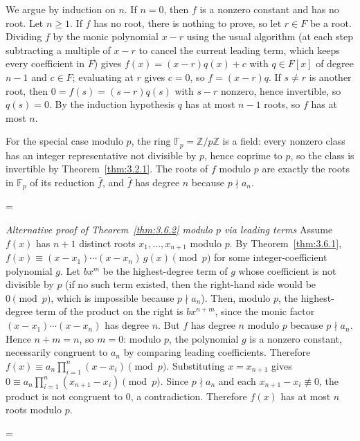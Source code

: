 \documentclass[11pt]{article}
\makeatletter
\theoremstyle{ntstyle}
\let\nt@closedisplay\]
\def\nt@guardedclose{\@ifnextchar\par{\nt@closeafterpar}{\@ifnextchar\end{\postdisplaypenalty\@M\nt@closedisplay}{\nt@closedisplay}}}
\def\nt@closeafterpar\par{\@ifnextchar\par{\nt@closeafterpar}{\@ifnextchar\end{\postdisplaypenalty\@M\nt@closedisplay\par}{\nt@closedisplay\par}}}
\renewenvironment{proof}[1][\proofname]{\par
  \pushQED{\qed}\normalfont\topsep\medskipamount\edef\nt@afterproof{\@endparpenalty=\the\@endparpenalty\relax}\@beginparpenalty\@M\@endparpenalty\@M\let\]\nt@guardedclose\trivlist\item[]\textit{#1\@addpunct{.}} \ignorespaces}{\ifvmode\addpenalty\@M\fi\popQED\nt@afterproof\endtrivlist\@endpefalse}
\newenvironment{altproof}[1][\proofname]{\begin{proof}[#1]\renewcommand{\qedsymbol}{}}{\end{proof}}
\makeatother
\begin{document}
\begin{proof} We argue by induction on $n$. If $n=0$, then $f$ is a nonzero constant
	and has no root. Let $n\ge1$. If $f$ has no root, there is nothing to prove,
	so let $r\in F$ be a root. Dividing $f$ by the monic polynomial $x-r$ using the
	usual algorithm (at each step subtracting a multiple of $x-r$ to cancel
	the current leading term, which keeps every coefficient in $F$) gives
	$f(x)=(x-r)q(x)+c$ with $q\in F[x]$ of degree $n-1$ and $c\in F$; evaluating
	at $r$ gives $c=0$, so $f=(x-r)q$. If $s\neq r$ is another root, then
	$0=f(s)=(s-r)q(s)$ with $s-r$ nonzero, hence invertible, so $q(s)=0$. By the
	induction hypothesis $q$ has at most $n-1$ roots, so $f$ has at most $n$.

	For the special case modulo $p$, the ring $\mathbb{F}_p=\mathbb{Z}/p\mathbb{Z}$ is a field:
	every nonzero class has an integer representative not divisible by $p$,
	hence coprime to $p$, so the class is invertible by
	Theorem~\ref{thm:3.2.1}. The roots of $f$ modulo $p$ are exactly the
	roots in $\mathbb{F}_p$ of its reduction $\bar f$, and $\bar f$ has degree
	$n$ because $p\nmid a_n$.

\end{proof}
\begin{altproof}[Alternative proof of Theorem~\ref{thm:3.6.2} modulo $p$ via leading terms] Assume $f(x)$ has $n+1$ distinct roots
	$x_1, \ldots, x_{n+1}$ modulo $p$. By Theorem~\ref{thm:3.6.1}, $f(x) \equiv (x
		- x_1) \cdots (x - x_n)\, g(x) \pmod{p}$ for some integer-coefficient
	polynomial $g$. Let $b x^m$ be the highest-degree term of $g$ whose
	coefficient is not divisible by $p$ (if no such term existed, then the
	right-hand side would be $0 \pmod{p}$, which is impossible because $p\nmid a_n$).
	Then, modulo $p$, the highest-degree term of the product on the right is
	$b x^{n+m}$, since the monic factor $(x-x_1)\cdots(x-x_n)$ has degree
	$n$. But $f$ has degree $n$ modulo $p$ because $p\nmid a_n$. Hence
	$n+m=n$, so $m=0$: modulo $p$, the polynomial $g$ is a nonzero constant, necessarily
	congruent to $a_n$ by comparing leading coefficients. Therefore
	$f(x) \equiv a_n \prod_{i=1}^{n}(x - x_i) \pmod{p}$. Substituting
	$x = x_{n+1}$ gives $0 \equiv a_n \prod_{i=1}^{n}(x_{n+1} - x_i)
		\pmod{p}$. Since $p \nmid a_n$ and each $x_{n+1} - x_i \not\equiv 0$,
	the product is not congruent to $0$, a contradiction. Therefore $f(x)$ has
	at most $n$ roots modulo $p$.

\end{altproof}
\clearpage
\end{document}
